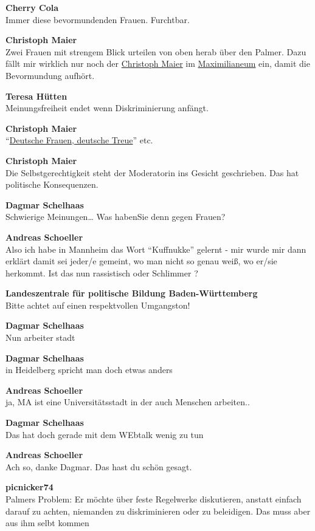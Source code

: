 \documentclass[]{article}
\begin{document}
\textbf{Cherry Cola}\\
Immer diese bevormundenden Frauen. Furchtbar.

\textbf{Christoph Maier}\\
Zwei Frauen mit strengem Blick urteilen von oben herab über den Palmer.
Dazu fällt mir wirklich nur noch der
\protect\hyperlink{Christoph-Maier-MdL}{Christoph Maier} im
\protect\hyperlink{Maximilianeum}{Maximilianeum} ein, damit die
Bevormundung aufhört.

\textbf{Teresa Hütten}\\
Meinungsfreiheit endet wenn Diskriminierung anfängt.

\textbf{Christoph Maier}\\
``\protect\hyperlink{Deutsche-Frauen}{Deutsche Frauen, deutsche
Treue}'' etc.

\textbf{Christoph Maier}\\
Die Selbstgerechtigkeit steht der Moderatorin ins Gesicht geschrieben.
Das hat politische Konsequenzen.

\textbf{Dagmar Schelhaas}\\
Schwierige Meinungen\ldots{} Was habenSie denn gegen Frauen?

\textbf{Andreas Schoeller}\\
Also ich habe in Mannheim das Wort ``Kuffnukke'' gelernt - mir wurde
mir dann erklärt damit sei jeder/e gemeint, wo man nicht so genau weiß,
wo er/sie herkommt. Ist das nun rassistisch oder Schlimmer ?

\textbf{Landeszentrale für politische Bildung Baden-Württemberg}\\
Bitte achtet auf einen respektvollen Umgangston!

\textbf{Dagmar Schelhaas}\\
Nun arbeiter stadt

\textbf{Dagmar Schelhaas}\\
in Heidelberg spricht man doch etwas anders

\textbf{Andreas Schoeller}\\
ja, MA ist eine Universitätsstadt in der auch Menschen arbeiten..

\textbf{Dagmar Schelhaas}\\
Das hat doch gerade mit dem WEbtalk wenig zu tun

\textbf{Andreas Schoeller}\\
Ach so, danke Dagmar. Das hast du schön gesagt.

\textbf{picnicker74}\\
Palmers Problem: Er möchte über feste Regelwerke diskutieren, anstatt
einfach darauf zu achten, niemanden zu diskriminieren oder zu
beleidigen. Das muss aber aus ihm selbt kommen
\end{document}
